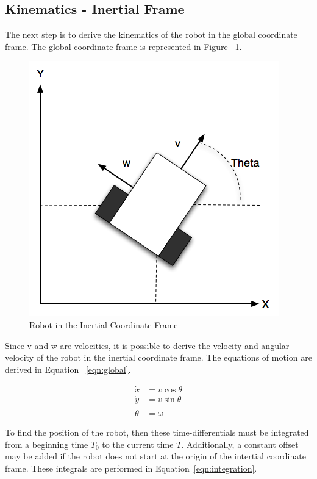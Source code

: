 \documentclass[10pt]{article}
\begin{document}
\newpage
\subsection{Kinematics - Inertial Frame}
The next step is to derive the kinematics of the robot in the global coordinate frame.  The global coordinate frame is represented in Figure ~\ref{fig:global}.

\begin{figure}[h]
 \centering
 \includegraphics[scale=0.4,keepaspectratio=true]{./global.png}
 \caption{Robot in the Inertial Coordinate Frame}
 \label{fig:global}
\end{figure}

Since v and w are velocities, it is possible to derive the velocity and angular velocity of the robot in the inertial coordinate frame.  The equations of motion are derived in Equation ~\ref{eqn:global}.

\begin{equation}
\begin{align}
\dot{x} &= v \cos{\theta} \\
\dot{y} &= v \sin{\theta} \\
\dot{\theta} &= \omega
\end{align}
\label{eqn:global}
\end{equation}

To find the position of the robot, then these time-differentials must be integrated from a beginning time $T_{0}$ to the current time $T$.  Additionally, a constant offset may be added if the robot does not start
at the origin of the intertial coordinate frame. These integrals are performed in Equation~\ref{eqn:integration}.
\end{document}
